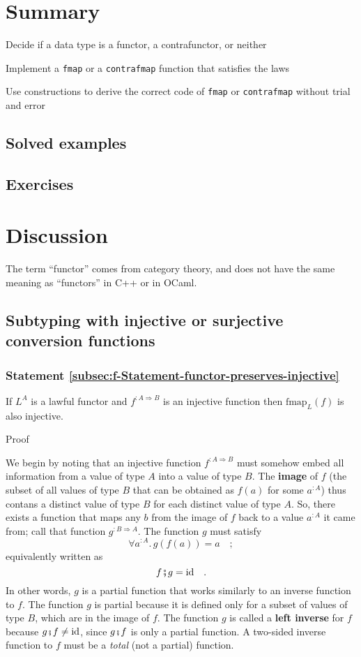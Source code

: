\section{Summary}

Decide if a data type is a functor, a contrafunctor, or neither

Implement a \lstinline!fmap! or a \lstinline!contrafmap! function
that satisfies the laws

Use constructions to derive the correct code of \lstinline!fmap!
or \lstinline!contrafmap! without trial and error

\subsection{Solved examples}

\subsection{Exercises}

\section{Discussion}

The term ``functor'' comes from category theory, and does not have
the same meaning as ``functors'' in C++ or in OCaml.

\subsection{Subtyping with injective or surjective conversion functions}

\subsubsection{Statement \label{subsec:f-Statement-functor-preserves-injective}\ref{subsec:f-Statement-functor-preserves-injective}}

If $L^{A}$ is a lawful functor and $f^{:A\Rightarrow B}$ is an injective
function then $\text{fmap}_{L}(f)$ is also injective.

Proof

We begin by noting that an injective function $f^{:A\Rightarrow B}$
must somehow embed all information from a value of type $A$ into
a value of type $B$. The \textbf{image} of $f$ (the subset of all
values of type $B$ that can be obtained as $f(a)$ for some $a^{:A}$)
thus contans a distinct value of type $B$ for each distinct value
of type $A$. So, there exists a function that maps any $b$ from
the image of $f$ back to a value $a^{:A}$ it came from; call that
function $g^{:B\Rightarrow A}$. The function $g$ must satisfy 
\[
\forall a^{:A}.\,g(f(a))=a\quad;
\]
equivalently written as 
\[
f\bef g=\text{id}\quad.
\]
In other words, $g$ is a partial function that works similarly to
an inverse function to $f$. The function $g$ is partial because
it is defined only for a subset of values of type $B$, which are
in the image of $f$. The function $g$ is called a \textbf{left inverse}
for $f$ because $g\bef f\neq\text{id}$, since $g\bef f$ is only
a partial function. A two-sided inverse function to $f$ must be a
\emph{total} (not a partial) function.


